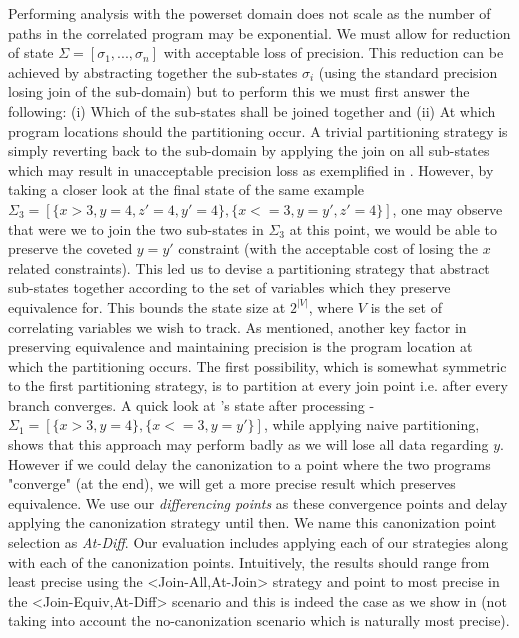 Performing analysis with the powerset domain does not scale as the number of paths in the correlated program may be exponential. We must allow for reduction of state $\Sigma = [\sigma_1,...,\sigma_n]$ with acceptable loss of precision. This reduction can be achieved by abstracting together the sub-states $\sigma_i$ (using the standard precision losing join of the sub-domain) but to perform this we must first answer the following: (i) Which of the sub-states shall be joined together and (ii) At which program locations should the partitioning occur. A trivial partitioning strategy is simply reverting back to the sub-domain by applying the join on all sub-states which may result in unacceptable precision loss as exemplified in . However, by taking a closer look at the final state of the same example $\Sigma_3 = [\{x>3,y=4,z'=4,y'=4\},\{x<=3,y=y',z'=4\}]$, one may observe that were we to join the two sub-states in $\Sigma_3$ at this point, we would be able to preserve the coveted $y=y'$ constraint (with the acceptable cost of losing the $x$ related constraints). This led us to devise a partitioning strategy that abstract sub-states together according to the set of variables which they preserve equivalence for. This bounds the state size at $2^{|V|}$, where $V$ is the set of correlating variables we wish to track. As mentioned, another key factor in preserving equivalence and maintaining precision is the program location at which the partitioning occurs. The first possibility, which is somewhat symmetric to the first partitioning strategy, is to partition at every join point i.e. after every branch converges. A quick look at 's state after processing  - $\Sigma_1 = [\{x>3,y=4\},\{x<=3,y=y'\}]$, while applying naive partitioning, shows that this approach may perform badly as we will lose all data regarding $y$. However if we could delay the canonization to a point where the two programs "converge" (at the end), we will get a more precise result which preserves equivalence. We use our \emph{differencing points} as these convergence points and delay applying the canonization strategy until then. We name this canonization point selection as \emph{At-Diff}. Our evaluation includes applying each of our strategies along with each of the canonization points. Intuitively, the results should range from least precise using the <Join-All,At-Join> strategy and point to most precise in the <Join-Equiv,At-Diff> scenario and this is indeed the case as we show in  (not taking into account the no-canonization scenario which is naturally most precise).

